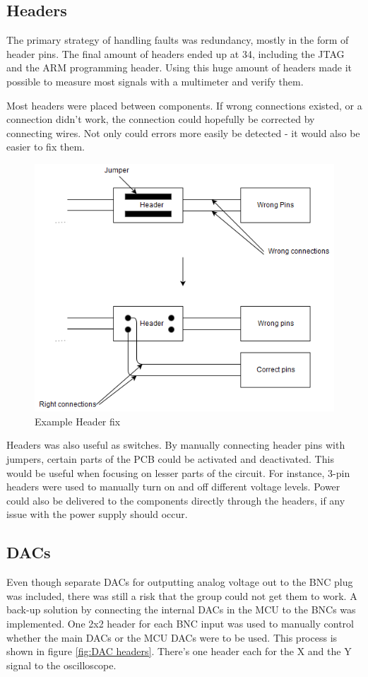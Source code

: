 \subsection{Headers}
The primary strategy of handling faults was redundancy, mostly in the form of header pins. 
The final amount of headers ended up at 34, including the JTAG and the ARM programming header. 
Using this huge amount of headers made it possible to measure most signals with a multimeter and verify them. 

Most headers were placed between components. 
If wrong connections existed, or a connection didn't work, the connection could hopefully be corrected by connecting wires. 
Not only could errors more easily be detected - it would also be easier to fix them.

\begin{figure}[h!]
\centering
\includegraphics[scale = 0.45]{images/Header_fix.png}
\caption{Example Header fix}
\label{fig:Header fix}
\end{figure}

Headers was also useful as switches. 
By manually connecting header pins with jumpers, certain parts of the PCB could be activated and deactivated. 
This would be useful when focusing on lesser parts of the circuit. 
For instance, 3-pin headers were used to manually turn on and off different voltage levels. 
Power could also be delivered to the components directly through the headers, if any issue with the power supply should occur.

\subsection{DACs}
Even though separate DACs for outputting analog voltage out to the BNC plug was included, there was still a risk that the group could not get them to work. 
A back-up solution by connecting the internal DACs in the MCU to the BNCs was implemented. 
One 2x2 header for each BNC input was used to manually control whether the main DACs or the MCU DACs were to be used. 
This process is shown in figure \ref{fig:DAC headers}. 
There's one header each for the X and the Y signal to the oscilloscope. 

